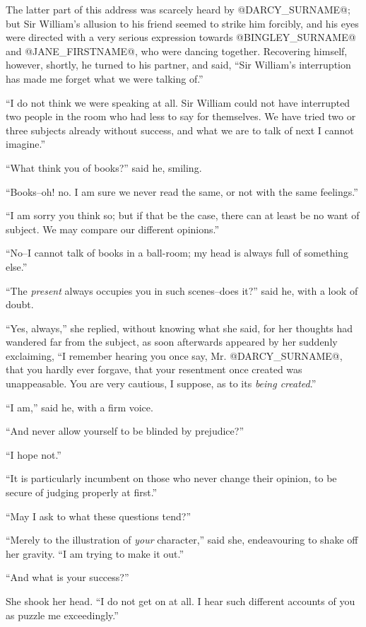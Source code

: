The latter part of this address was scarcely heard by @DARCY_SURNAME@; but Sir
William's allusion to his friend seemed to strike him forcibly, and his
eyes were directed with a very serious expression towards @BINGLEY_SURNAME@ and
@JANE_FIRSTNAME@, who were dancing together. Recovering himself, however, shortly,
he turned to his partner, and said, ``Sir William's interruption has made
me forget what we were talking of.''

``I do not think we were speaking at all. Sir William could not have
interrupted two people in the room who had less to say for themselves.
We have tried two or three subjects already without success, and what we
are to talk of next I cannot imagine.''

``What think you of books?'' said he, smiling.

``Books--oh! no. I am sure we never read the same, or not with the same
feelings.''

``I am sorry you think so; but if that be the case, there can at least be
no want of subject. We may compare our different opinions.''

``No--I cannot talk of books in a ball-room; my head is always full of
something else.''

``The \textit{present} always occupies you in such scenes--does it?'' said he,
with a look of doubt.

``Yes, always,'' she replied, without knowing what she said, for her
thoughts had wandered far from the subject, as soon afterwards appeared
by her suddenly exclaiming, ``I remember hearing you once say, Mr. @DARCY_SURNAME@,
that you hardly ever forgave, that your resentment once created was
unappeasable. You are very cautious, I suppose, as to its \textit{being
created}.''

``I am,'' said he, with a firm voice.

``And never allow yourself to be blinded by prejudice?''

``I hope not.''

``It is particularly incumbent on those who never change their opinion,
to be secure of judging properly at first.''

``May I ask to what these questions tend?''

``Merely to the illustration of \textit{your} character,'' said she, endeavouring
to shake off her gravity. ``I am trying to make it out.''

``And what is your success?''

She shook her head. ``I do not get on at all. I hear such different
accounts of you as puzzle me exceedingly.''

